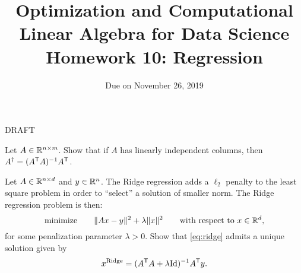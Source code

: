 \documentclass[11pt,nocut]{article}
\title{\vspace{-2.0cm}%
	Optimization and Computational Linear Algebra for Data Science\\
Homework 10: Regression}
\date{\vspace{-1cm}Due on November 26, 2019}
\begin{document}
\maketitle


DRAFT

\color{green}
\vspace{4mm}

\begin{problem}[2 points]
	Let $A \in \mathbb{R}^{n \times m}$. Show that if $A$ has linearly independent columns, then $A^{\dagger} = (A^{{\sf T}}A)^{-1} A^{{\sf T}}$.
\end{problem}

\vspace{4mm}

\begin{problem}[2 points]
	Let $A \in \mathbb{R}^{n \times d}$ and $y \in \mathbb{R}^n$.
	The Ridge regression adds a $\ell_2$ penalty to the least square problem in order to ``select'' a solution of smaller norm. The Ridge regression problem is then:
	\begin{equation}\label{eq:ridge}
		\text{minimize} \qquad
		\| Ax - y \|^2 + \lambda \|x\|^2 \qquad \text{with respect to} \ x \in \R^d,
	\end{equation}
	for some penalization parameter $\lambda >0$.
	Show that \eqref{eq:ridge} admits a unique solution given by
	$$
	x^{\rm Ridge} = (A^{{\sf T}} A + \lambda {{\rm Id}})^{-1} A^{{\sf T}} y.
	$$
\end{problem}

\newpage

\begin{problem}[3 points]\label{prob:strongly_convex}
\end{problem}

\vspace{4mm}

\begin{problem}[3 points]
	\begin{enumerate}[label=\normalfont(\textbf{\alph*})]
	\end{enumerate}
\end{problem}

\vspace{4mm}

\begin{problem}[$\star$]
\end{problem}

\vspace{1cm}
\centerline{}

%
%
\end{document}
